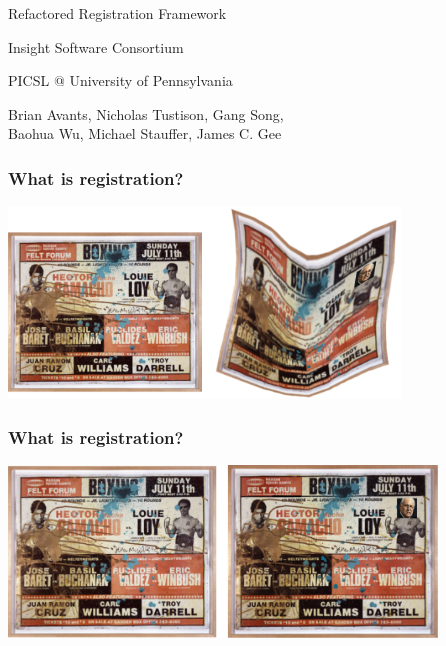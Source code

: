 {
\color{white}
\begin{frame}[plain]
\fontsize{36pt}{36pt}\selectfont
\center
\begin{center}
Refactored Registration Framework
\end{center}

\fontsize{12pt}{12pt}\selectfont
\begin{center}
Insight Software Consortium
\end{center}
\newline
\begin{center}
 PICSL @ University of Pennsylvania 
\end{center}
\newline
\begin{center}
 Brian Avants, Nicholas Tustison, Gang Song, \\ 
Baohua Wu, Michael Stauffer, James C. Gee
\end{center}
\end{frame}
}

\begin{frame}
\frametitle{What is registration?}
\includegraphics[height=2in]{../Art/RegistrationBasquiatWarp.pdf}
\end{frame}

\begin{frame}
\frametitle{What is registration?}
\includegraphics[height=1.8in]{../Art/RegistrationBasquiatDeWarp.pdf}
\end{frame}

